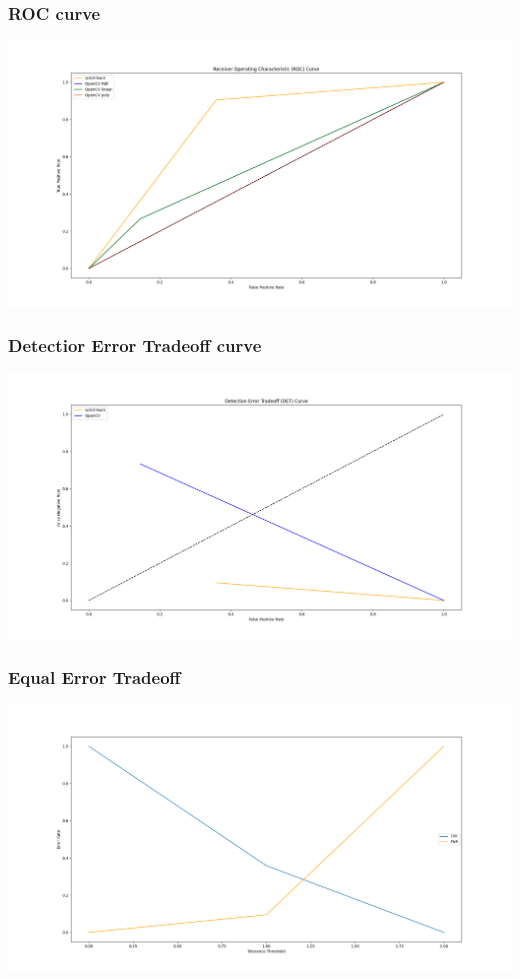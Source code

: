 \documentclass{beamer}
\begin{document}
\begin{frame}
    \frametitle{ROC curve}
    \begin{center}
        \includegraphics[scale=0.23]{../paper/images/roc.png}
    \end{center}
\end{frame}

\begin{frame}
    \frametitle{Detectior Error Tradeoff curve}
    \begin{center}
        \includegraphics[scale=0.23]{../paper/images/det.png}
    \end{center}
\end{frame}

\begin{frame}
    \frametitle{Equal Error Tradeoff}
    \begin{center}
        \includegraphics[scale=0.23]{../paper/images/eet.png}
    \end{center}
\end{frame}
\end{document}
